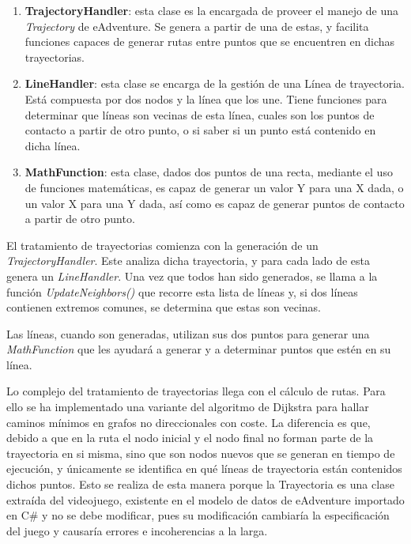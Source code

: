 \begin{enumerate}
	\item \textbf{TrajectoryHandler}: esta clase es la encargada de proveer el manejo de una \textit{Trajectory} de eAdventure. Se genera a partir de una de estas, y facilita funciones capaces de generar rutas entre puntos que se encuentren en dichas trayectorias.
	
	\item \textbf{LineHandler}: esta clase se encarga de la gestión de una Línea de trayectoria. Está compuesta por dos nodos y la línea que los une. Tiene funciones para determinar que líneas son vecinas de esta línea, cuales son los puntos de contacto a partir de otro punto, o si saber si un punto está contenido en dicha línea.
	
	\item \textbf{MathFunction}: esta clase, dados dos puntos de una recta, mediante el uso de funciones matemáticas, es capaz de generar un valor Y para una X dada, o un valor X para una Y dada, así como es capaz de generar puntos de contacto a partir de otro punto.
\end{enumerate}

El tratamiento de trayectorias comienza con la generación de un \textit{TrajectoryHandler}. Este analiza dicha trayectoria, y para cada lado de esta genera un \textit{LineHandler}. Una vez que todos han sido generados, se llama a la función \textit{UpdateNeighbors()} que recorre esta lista de líneas y, si dos líneas contienen extremos comunes, se determina que estas son vecinas.

Las líneas, cuando son generadas, utilizan sus dos puntos para generar una \textit{MathFunction} que les ayudará a generar y a determinar puntos que estén en su línea.

Lo complejo del tratamiento de trayectorias llega con el cálculo de rutas. Para ello se ha implementado una variante del algoritmo de Dijkstra \cite{Bollobas1993} para hallar caminos mínimos en grafos no direccionales con coste. La diferencia es que, debido a que en la ruta el nodo inicial y el nodo final no forman parte de la trayectoria en si misma, sino que son nodos nuevos que se generan en tiempo de ejecución, y únicamente se identifica en qué líneas de trayectoria están contenidos dichos puntos. Esto se realiza de esta manera porque la Trayectoria es una clase extraída del videojuego, existente en el modelo de datos de eAdventure importado en C\# y no se debe modificar, pues su modificación cambiaría la especificación del juego y causaría errores e incoherencias a la larga.

